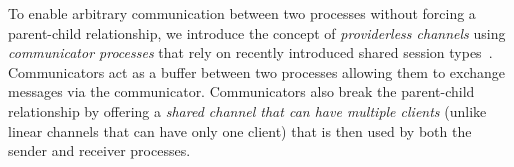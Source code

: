%
%

To enable arbitrary communication between two processes without forcing a parent-child relationship, we introduce
the concept of \emph{providerless channels} using \emph{communicator processes} that rely on recently introduced shared session types~\cite{balzer2017manifest}.
Communicators act as a buffer between two processes allowing them to exchange messages via the communicator.
Communicators also break the parent-child relationship by offering a \emph{shared channel that can have multiple clients}
(unlike linear channels that can have only one client) that is then used by both the sender and receiver processes.

